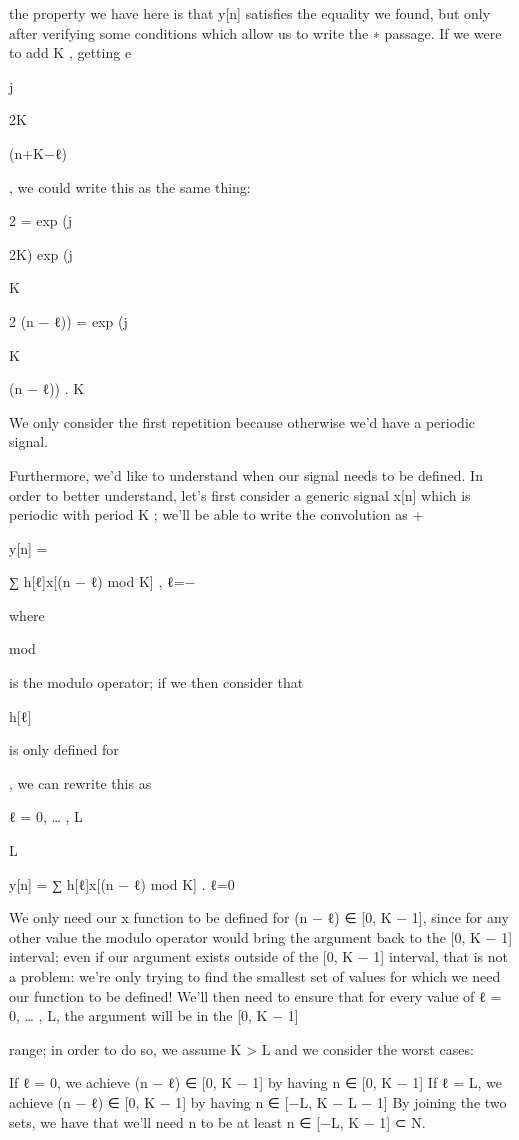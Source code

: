 {the property we have here is that y[n] satisfies the equality we found, but only after verifying some conditions which allow us to write the ∗ passage.
If we were to add K , getting e

j

2\pi K

(n+K−ℓ)

, we could write this as the same thing:

2\pi
= exp (j

2\pi K) exp (j

K

2\pi
(n − ℓ)) = exp (j

K

(n − ℓ)) .
K

We only consider the first repetition because otherwise we'd have a periodic signal.

Furthermore, we'd like to understand when our signal needs to be defined. In order to better understand, let's first consider a generic signal x[n] which is periodic with period K ; we'll be able to write the convolution as
+\infty

y[n] =

∑ h[ℓ]x[(n − ℓ) mod K] ,
ℓ=−\infty

where

mod

is the modulo operator; if we then consider that

h[ℓ]

is only defined for

, we can rewrite this as

ℓ = 0, … , L

L

y[n] = ∑ h[ℓ]x[(n − ℓ) mod K] .
ℓ=0

We only need our x function to be defined for (n − ℓ) ∈ [0, K − 1], since for any other value the modulo operator would bring the argument back to the [0, K − 1] interval; even if our argument exists outside of the [0, K − 1] interval, that is not a problem: we're only trying to find the smallest set of values for which we need our function to be defined!
We'll then need to ensure that for every value of ℓ = 0, … , L, the argument will be in the
[0, K − 1]

range; in order to do so, we assume K > L and we consider the worst cases:

If ℓ = 0, we achieve (n − ℓ) ∈ [0, K − 1] by having n ∈ [0, K − 1]
If ℓ = L, we achieve (n − ℓ) ∈ [0, K − 1] by having n ∈ [−L, K − L − 1]
By joining the two sets, we have that we'll need n to be at least n ∈ [−L, K − 1] ⊂ N.

}
